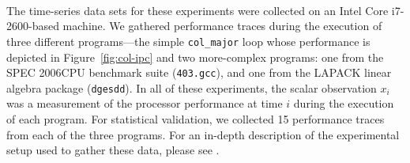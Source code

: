 \documentclass[%
pre,
reprint,
superscriptaddress,
showpacs,
nofootinbib,
nobibnotes,
 amsmath,amssymb,
 aps,
]{revtex4-1}
\newcommand{\gcc}{{\tt 403.gcc}\xspace}
\newcommand{\svd}{{\tt dgesdd}\xspace}
\newcommand{\col}{{\tt col\_major}\xspace}
\begin{document}
The time-series data sets for these experiments were collected on an
Intel Core\textsuperscript{\textregistered} i7-2600-based machine.
% 
% 
We gathered performance traces during the execution of three different
programs---the simple \col loop whose performance is depicted in
Figure~\ref{fig:col-ipc} and two more-complex programs: one from the
SPEC 2006CPU benchmark suite (\gcc), and one from the LAPACK linear
algebra package (\svd).  In all of these experiments, the scalar
observation $x_i$ was a measurement of the processor performance at
time $i$ during the execution of each program.
% 
% 
% 
For statistical validation, we collected 15 performance traces from
each of the three programs.  For an in-depth description of the
experimental setup used to gather these data,
please see
\cite{josh-ida2011,josh-ida2013,zach-IDA10,mytkowicz09,todd-phd}.



\end{document}
